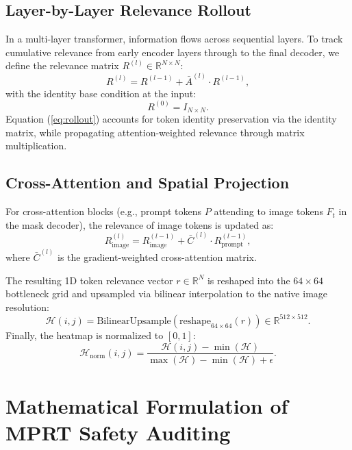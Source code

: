 \documentclass[journal,10pt,twocolumn]{IEEEtran}
\begin{document}
\subsection{Layer-by-Layer Relevance Rollout}
In a multi-layer transformer, information flows across sequential layers. To track cumulative relevance from early encoder layers through to the final decoder, we define the relevance matrix $R^{(l)} \in \mathbb{R}^{N \times N}$:
\begin{equation}
    R^{(l)} = R^{(l-1)} + \bar{A}^{(l)} \cdot R^{(l-1)},
    \label{eq:rollout}
\end{equation}
with the identity base condition at the input:
\begin{equation}
    R^{(0)} = I_{N \times N}.
\end{equation}
Equation (\ref{eq:rollout}) accounts for token identity preservation via the identity matrix, while propagating attention-weighted relevance through matrix multiplication.

\subsection{Cross-Attention and Spatial Projection}
For cross-attention blocks (e.g., prompt tokens $P$ attending to image tokens $F_t$ in the mask decoder), the relevance of image tokens is updated as:
\begin{equation}
    R_{\text{image}}^{(l)} = R_{\text{image}}^{(l-1)} + \bar{C}^{(l)} \cdot R_{\text{prompt}}^{(l-1)},
\end{equation}
where $\bar{C}^{(l)}$ is the gradient-weighted cross-attention matrix.

The resulting 1D token relevance vector $r \in \mathbb{R}^{N}$ is reshaped into the $64 \times 64$ bottleneck grid and upsampled via bilinear interpolation to the native image resolution:
\begin{equation}
    \mathcal{H}(i, j) = \text{BilinearUpsample}\left( \text{reshape}_{64 \times 64}(r) \right) \in \mathbb{R}^{512 \times 512}.
\end{equation}
Finally, the heatmap is normalized to $[0, 1]$:
\begin{equation}
    \mathcal{H}_{\text{norm}}(i, j) = \frac{\mathcal{H}(i, j) - \min(\mathcal{H})}{\max(\mathcal{H}) - \min(\mathcal{H}) + \epsilon}.
\end{equation}

\section{Mathematical Formulation of MPRT Safety Auditing}
\label{sec:mprt}
\end{document}
